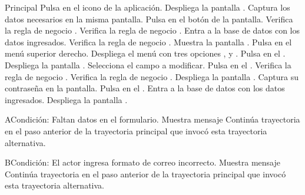	\begin{UCtrayectoria}{Principal}
		\UCpaso[\UCactor] Pulsa en el icono de la aplicación.
		\UCpaso[\UCsist] Despliega la pantalla .
		\UCpaso[\UCactor] Captura los datos necesarios en la misma pantalla.
		\UCpaso[\UCactor] Pulsa en el botón  de la pantalla.
		\UCpaso[\UCsist] Verifica la regla de negocio . 
		\UCpaso[\UCsist] Verifica la regla de negocio . 
		\UCpaso[\UCsist] Entra a la base de datos con los datos ingresados. 
		\UCpaso[\UCsist] Verifica la regla de negocio . 		
		\UCpaso[\UCsist] Muestra la pantalla .
		\UCpaso[\UCactor] Pulsa en el menú superior derecho.
		\UCpaso[\UCsist] Despliega el menú con tres opciones , y .
		\UCpaso[\UCactor] Pulsa en el  .
		\UCpaso[\UCsist] Despliega la pantalla .
		\UCpaso[\UCactor] Selecciona el campo a modificar.
		\UCpaso[\UCactor] Pulsa en el  .
		\UCpaso[\UCsist] Verifica la regla de negocio . 
		\UCpaso[\UCsist] Verifica la regla de negocio . 
		\UCpaso[\UCsist] Despliega la pantalla .
		\UCpaso[\UCactor] Captura su contraseña en la pantalla.
		\UCpaso[\UCactor] Pulsa en el  .
		\UCpaso[\UCsist] Entra a la base de datos con los datos ingresados.   
		\UCpaso[\UCsist] Despliega la pantalla .
	\end{UCtrayectoria}
	\begin{UCtrayectoriaA}{A}{Condición: Faltan datos en el formulario.}
		\UCpaso[\UCsist] Muestra mensaje 
		\UCpaso[\UCsist] Continúa trayectoria en el paso anterior de la trayectoria  principal que invocó esta trayectoria alternativa. 
	\end{UCtrayectoriaA}
	\begin{UCtrayectoriaA}{B}{Condición: El actor ingresa formato de correo incorrecto.}
		\UCpaso[\UCsist] Muestra mensaje 
		\UCpaso[\UCsist] Continúa trayectoria en el paso anterior de la trayectoria  principal que invocó esta trayectoria alternativa.  
	\end{UCtrayectoriaA}
